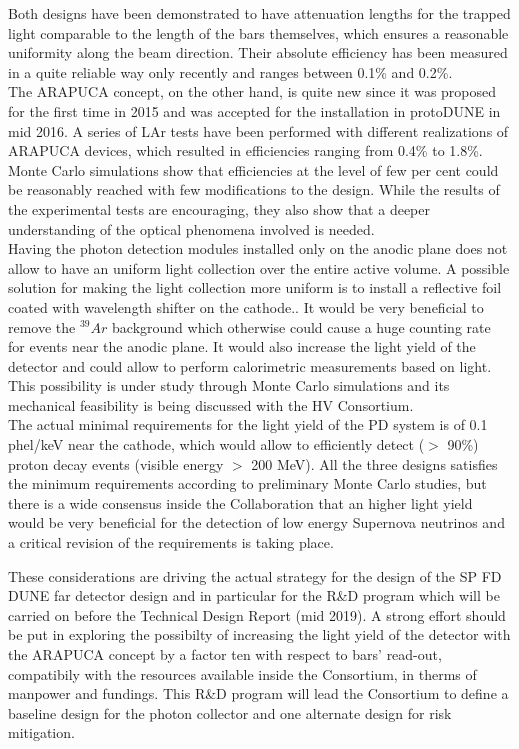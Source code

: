 Both designs have been demonstrated to have attenuation lengths for the 
trapped light comparable to the length of the bars themselves, which ensures a 
reasonable uniformity along the beam direction. Their absolute efficiency has 
been measured in a quite reliable way only recently and ranges between 0.1\% and
0.2\%.\\
 
The ARAPUCA concept, on the other hand, is quite new since it was proposed for 
the first time in 2015 and was accepted for the installation in protoDUNE in 
mid 2016. A series of LAr tests have been performed with different 
realizations of ARAPUCA devices, which resulted in efficiencies ranging from 
0.4\% to 1.8\%. Monte Carlo simulations show that efficiencies at the level of 
few per cent could be reasonably reached with few modifications to the design. 
While the results of the experimental tests are encouraging, they also show 
that a deeper understanding of the optical phenomena involved is needed.\\ 


Having the photon detection modules installed only on the anodic plane does 
not allow to have an uniform light collection over the entire active volume. A
possible solution 
for making the light collection more uniform is to install a 
reflective foil coated with wavelength shifter on the cathode.. It would be very
beneficial to remove the $^{39}Ar$ 
background which otherwise could cause a huge counting rate for events near 
the anodic plane. It would also increase the light yield of the detector and 
could allow to perform calorimetric measurements based on light.  This 
possibility is under study through Monte Carlo simulations and its mechanical
feasibility is being discussed with the HV Consortium.\\

The actual minimal requirements for the light yield of the PD system is of 0.1 
phel/keV near the cathode, which would allow to efficiently  detect ($>$ 90\%) 
proton decay events (visible energy $>$ 200 MeV). All the three designs 
satisfies the minimum requirements according to preliminary Monte Carlo 
studies, but there is a wide consensus inside the Collaboration that an higher 
light yield would be very beneficial for the detection of low energy Supernova 
neutrinos and a critical revision of the requirements is taking place.

These considerations are driving the actual strategy for the design of the SP 
FD DUNE far detector design and in particular for the R\&D program which will 
be carried on before the Technical Design Report (mid 2019). A strong effort 
should be put in exploring the possibilty of increasing the light yield of the 
detector with the ARAPUCA concept by a factor ten with respect to bars' 
read-out, compatibily with the resources available inside the Consortium, in 
therms of manpower and fundings. This R\&D program will lead the Consortium to 
define a baseline design for the photon collector and one alternate design for risk
mitigation.  

